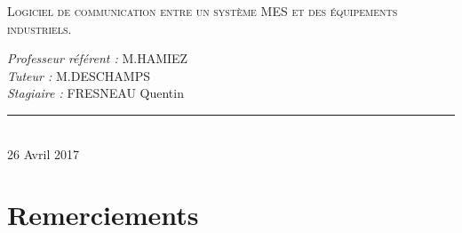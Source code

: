 \documentclass[a4paper,12pt]{extarticle}
\newcommand{\HRule}{\rule{\linewidth}{0.5mm}}
\begin{document}
\begin{titlepage}
\begin{sffamily}
\begin{center}
		\textsc{\LARGE Logiciel de communication entre un système MES et des équipements industriels.}\\[1.5cm] 
		
		\begin{minipage}{0.6\textwidth}
			\begin{flushleft} \large
			\begin{center}
				\emph{Professeur référent : }\textsf{M.HAMIEZ} \\
				\emph{Tuteur : }\textsf{M.DESCHAMPS} \\
				\emph{Stagiaire : }\textsf{FRESNEAU Quentin}
			\end{center}
			\end{flushleft}
		\end{minipage}
		
		\vfill
		\HRule\\[1cm]
		{\large 26 Avril 2017}
		
		\end{center}
		\end{sffamily}
	\end{titlepage}
	\clearpage
	
	\tableofcontents
	
	\clearpage

	\section{Remerciements}
		\paragraph{}
\end{document}
